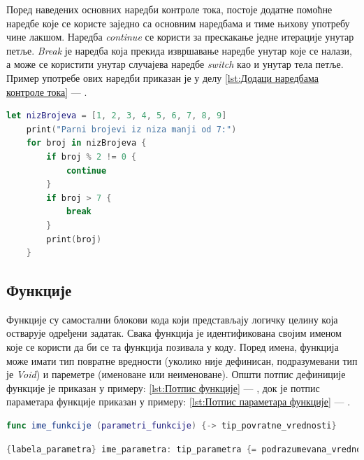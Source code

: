 \documentclass[12pt,oneside]{memoir}
\begin{document}
\indent Поред наведених основних наредби контроле тока, постоје додатне помоћне наредбе које се користе заједно са основним наредбама и тиме њихову употребу чине лакшом. Наредба \textit{continue} се користи за прескакање једне итерације унутар петље. \textit{Break} је наредба која прекида извршавање наредбе унутар које се налази, а може се користити унутар случајева наредбе \textit{switch} као и унутар тела петље. Пример употребе ових наредби приказан је у делу \ref{lst:Додаци наредбама контроле тока} --- .

\begin{lstlisting}[caption=\textit{{Додаци наредбaма контроле тока}}, label={lst:Додаци наредбама контроле тока}, language=Swift, frame=single]
    let nizBrojeva = [1, 2, 3, 4, 5, 6, 7, 8, 9]
    print("Parni brojevi iz niza manji od 7:")
    for broj in nizBrojeva {
        if broj % 2 != 0 {
            continue
        }
        if broj > 7 {
            break
        }
        print(broj)
    }
\end{lstlisting}

\subsection{Функције}

\indent Функције су самостални блокови кода који представљају логичку целину која остварује одређени задатак. Свака функција је идентификована својим именом које се користи да би се та функција позивала у коду. Поред имена, функција може имати тип повратне вредности (уколико није дефинисан, подразумевани тип је \textit{Void}) и пареметре (именоване или неименоване). Општи потпис дефиниције функције је приказан у примеру: \ref{lst:Потпис функције} --- , док је потпис параметара функције приказан у примеру: \ref{lst:Потпис параметара функције} --- .

\begin{lstlisting}[caption=\textit{{Потпис функције}}, label={lst:Потпис функције}, language=Swift, frame=single]
func ime_funkcije (parametri_funkcije) {-> tip_povratne_vrednosti}
\end{lstlisting}

\begin{lstlisting}[caption=\textit{{Потпис параметара функције}}, label={lst:Потпис параметара функције}, language=Swift, frame=single]
{labela_parametra} ime_parametra: tip_parametra {= podrazumevana_vrednost}
\end{lstlisting}
\end{document}
